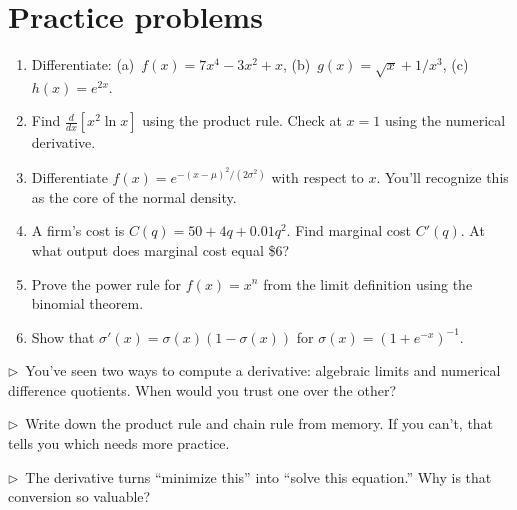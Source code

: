\section{Practice problems}

\begin{enumerate}
  \item Differentiate: (a)~$f(x) = 7x^4 - 3x^2 + x$, \; (b)~$g(x) = \sqrt{x} + 1/x^3$, \; (c)~$h(x) = e^{2x}$.

  \item Find $\frac{d}{dx}[x^2 \ln x]$ using the product rule. Check at $x = 1$ using the numerical derivative.

  \item Differentiate $f(x) = e^{-(x-\mu)^2/(2\sigma^2)}$ with respect to $x$. You'll recognize this as the core of the normal density.

  \item A firm's cost is $C(q) = 50 + 4q + 0.01q^2$. Find marginal cost $C'(q)$. At what output does marginal cost equal \$6?

  \item Prove the power rule for $f(x) = x^n$ from the limit definition using the binomial theorem.

  \item Show that $\sigma'(x) = \sigma(x)(1 - \sigma(x))$ for $\sigma(x) = (1 + e^{-x})^{-1}$.
\end{enumerate}

\begin{reflect}
$\triangleright$~You've seen two ways to compute a derivative: algebraic limits and numerical difference quotients. When would you trust one over the other?

\smallskip
$\triangleright$~Write down the product rule and chain rule from memory. If you can't, that tells you which needs more practice.

\smallskip
$\triangleright$~The derivative turns ``minimize this'' into ``solve this equation.'' Why is that conversion so valuable?
\end{reflect}

